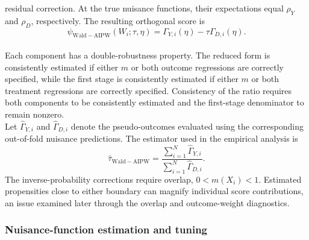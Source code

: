 \documentclass[12pt, a4paper, oneside]{article}
\theoremstyle{plain}
\theoremstyle{definition}
\begin{document}
residual correction. At the true nuisance functions, their expectations equal
\(\rho_Y\) and \(\rho_D\), respectively. The resulting orthogonal score is
\begin{equation}
    \psi_{\mathrm{Wald-AIPW}}(W_i;\tau,\eta)
    =
    \Gamma_{Y,i}(\eta)-\tau\Gamma_{D,i}(\eta).
    \label{eq:wald_aipw_score}
\end{equation}\\
Each component has a double-robustness property. The reduced form is
consistently estimated if either \(m\) or both outcome regressions are
correctly specified, while the first stage is consistently estimated if
either \(m\) or both treatment regressions are correctly specified.
Consistency of the ratio requires both components to be consistently
estimated and the first-stage denominator to remain nonzero.\\
Let \(\widehat\Gamma_{Y,i}\) and \(\widehat\Gamma_{D,i}\) denote the
pseudo-outcomes evaluated using the corresponding out-of-fold nuisance
predictions. The estimator used in the empirical analysis is
\begin{equation}
    \widehat\tau_{\mathrm{Wald-AIPW}}
    =
    \frac{\sum_{i=1}^{N}\widehat\Gamma_{Y,i}}
         {\sum_{i=1}^{N}\widehat\Gamma_{D,i}}.
    \label{eq:wald_aipw_estimator}
\end{equation}
The inverse-probability corrections require overlap,
\(0<m(X_i)<1\). Estimated propensities close to either boundary can magnify
individual score contributions, an issue examined later through the
overlap and outcome-weight diagnostics. 





\subsubsection{Nuisance-function estimation and tuning}
\end{document}
